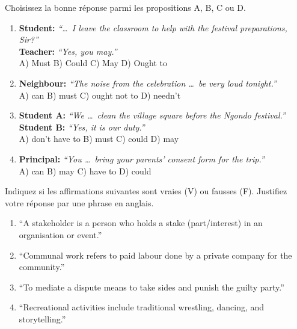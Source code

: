 \documentclass[11pt]{article}
\newcommand{\cle}[1]{{\popxbold\color{popdark}#1}}
\begin{document}
\begin{exercice}
Choisissez la bonne réponse parmi les propositions A, B, C ou D.

\begin{enumerate}
\item \textbf{Student:} \emph{``\dots\ I leave the classroom to help with the festival preparations, Sir?''} \\
\textbf{Teacher:} \emph{``Yes, you may.''} \\
A) Must \quad B) Could \quad C) May \quad D) Ought to

\item \textbf{Neighbour:} \emph{``The noise from the celebration \dots\ be very loud tonight.''} \\
A) can \quad B) must \quad C) ought not to \quad D) needn't

\item \textbf{Student A:} \emph{``We \dots\ clean the village square before the Ngondo festival.''} \\
\textbf{Student B:} \emph{``Yes, it is our duty.''} \\
A) don't have to \quad B) must \quad C) could \quad D) may

\item \textbf{Principal:} \emph{``You \dots\ bring your parents' consent form for the trip.''} \\
A) can \quad B) may \quad C) have to \quad D) could
\end{enumerate}
\end{exercice}

\begin{exercice}
Indiquez si les affirmations suivantes sont vraies (V) ou fausses (F). Justifiez votre réponse par une phrase en anglais.

\begin{enumerate}
\item ``A \cle{stakeholder} is a person who holds a stake (part/interest) in an organisation or event.''
\item ``\cle{Communal work} refers to paid labour done by a private company for the community.''
\item ``To \cle{mediate} a dispute means to take sides and punish the guilty party.''
\item ``\cle{Recreational activities} include traditional wrestling, dancing, and storytelling.''
\end{enumerate}
\end{exercice}
\end{document}
